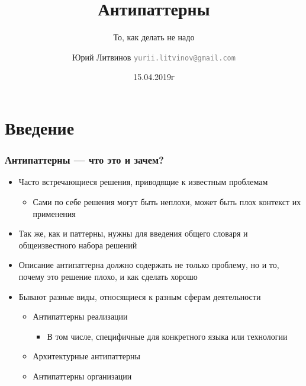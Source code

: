 \documentclass[xetex,mathserif,serif]{beamer}
\title{Антипаттерны}
\subtitle{То, как делать не надо}
\author[Юрий Литвинов]{Юрий Литвинов \newline \textcolor{gray}{\small\texttt{yurii.litvinov@gmail.com}}}
\date{15.04.2019г}
\begin{document}
	
	\frame{\titlepage}

	\section{Введение}

	\begin{frame}
		\frametitle{Антипаттерны --- что это и зачем?}
		\begin{itemize}
			\item Часто встречающиеся решения, приводящие к известным проблемам
			\begin{itemize}
				\item Сами по себе решения могут быть неплохи, может быть плох контекст их применения
			\end{itemize}
			\item Так же, как и паттерны, нужны для введения общего словаря и общеизвестного набора решений
			\item Описание антипаттерна должно содержать не только проблему, но и то, почему это решение плохо, и как сделать хорошо
			\item Бывают разные виды, относящиеся к разным сферам деятельности
			\begin{itemize}
				\item Антипаттерны реализации
				\begin{itemize}
					\item В том числе, специфичные для конкретного языка или технологии
				\end{itemize}
				\item Архитектурные антипаттерны
				\item Антипаттерны организации
			\end{itemize}
		\end{itemize}
	\end{frame}
\end{document}
